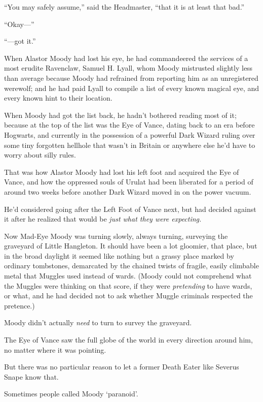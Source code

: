 “You may safely assume,” said the Headmaster, “that it is at least that bad.”

“Okay—”

“—got it.”


When Alastor Moody had lost his eye, he had commandeered the services of a most erudite Ravenclaw, Samuel H. Lyall, whom Moody mistrusted slightly less than average because Moody had refrained from reporting him as an unregistered werewolf; and he had paid Lyall to compile a list of every known magical eye, and every known hint to their location.

When Moody had got the list back, he hadn’t bothered reading most of it; because at the top of the list was the Eye of Vance, dating back to an era before Hogwarts, and currently in the possession of a powerful Dark Wizard ruling over some tiny forgotten hellhole that wasn’t in Britain or anywhere else he’d have to worry about silly rules.

That was how Alastor Moody had lost his left foot and acquired the Eye of Vance, and how the oppressed souls of Urulat had been liberated for a period of around two weeks before another Dark Wizard moved in on the power vacuum.

He’d considered going after the Left Foot of Vance next, but had decided against it after he realized that would be \emph{just what they were expecting.}

Now Mad-Eye Moody was turning slowly, always turning, surveying the graveyard of Little Hangleton. It should have been a lot gloomier, that place, but in the broad daylight it seemed like nothing but a grassy place marked by ordinary tombstones, demarcated by the chained twists of fragile, easily climbable metal that Muggles used instead of wards. (Moody could not comprehend what the Muggles were thinking on that score, if they were \emph{pretending} to have wards, or what, and he had decided not to ask whether Muggle criminals respected the pretence.)

Moody didn’t actually \emph{need} to turn to survey the graveyard.

The Eye of Vance saw the full globe of the world in every direction around him, no matter where it was pointing.

But there was no particular reason to let a former Death Eater like Severus Snape know that.

Sometimes people called Moody ‘paranoid’.

